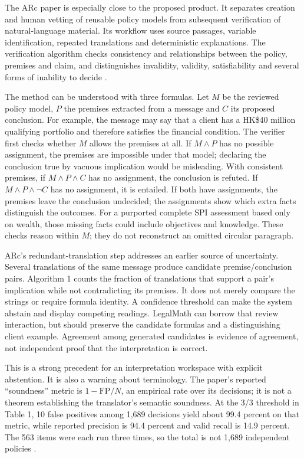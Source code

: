 \documentclass[12pt,a4paper,oneside,openany]{book}
\begin{document}
The ARc paper is especially close to the proposed product. It separates creation
and human vetting of reusable policy models from subsequent verification of
natural-language material. Its workflow uses source passages, variable
identification, repeated translations and deterministic explanations. The
verification algorithm checks consistency and relationships between the policy,
premises and claim, and distinguishes invalidity, validity, satisfiability and
several forms of inability to decide
\citep[sec.~3 and Algorithm~1]{arc2025}.

The method can be understood with three formulas. Let $M$ be the reviewed policy
model, $P$ the premises extracted from a message and $C$ its proposed conclusion.
For example, the message may say that a client has a HK\$40 million qualifying
portfolio and therefore satisfies the financial condition. The verifier first
checks whether $M$ allows the premises at all. If $M\land P$ has no possible
assignment, the premises are impossible under that model; declaring the
conclusion true by vacuous implication would be misleading. With consistent
premises, if $M\land P\land C$ has no assignment, the conclusion is refuted.
If $M\land P\land\neg C$ has no assignment, it is entailed. If both have
assignments, the premises leave the conclusion undecided; the assignments show
which extra facts distinguish the outcomes. For a purported complete SPI
assessment based only on wealth, those missing facts could include objectives
and knowledge. These checks reason within $M$; they do not reconstruct an
omitted circular paragraph.

ARc's redundant-translation step addresses an earlier source of uncertainty.
Several translations of the same message produce candidate premise/conclusion
pairs. Algorithm 1 counts the fraction of translations that support a pair's
implication while not contradicting its premises. It does not merely compare
the strings or require formula identity. A confidence threshold can make the
system abstain and display competing readings. LegalMath can borrow that
review interaction, but should preserve the candidate formulas and a
distinguishing client example. Agreement among generated candidates is evidence
of agreement, not independent proof that the interpretation is correct.

This is a strong precedent for an interpretation workspace with explicit
abstention. It is also a warning about terminology. The paper's reported
``soundness'' metric is $1-\mathrm{FP}/N$, an empirical rate over its decisions;
it is not a theorem establishing the translator's semantic soundness. At the
3/3 threshold in Table 1, 10 false positives among 1,689 decisions yield about
99.4 percent on that metric, while reported precision is 94.4 percent and valid
recall is 14.9 percent. The 563 items were each run three times, so the total is
not 1,689 independent policies \citep[sec.~4, Table~1]{arc2025}.
\end{document}
